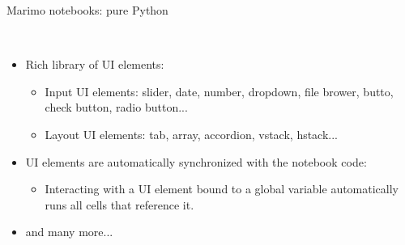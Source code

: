 \documentclass[11pt, serif, mathserif, compress]{beamer}  %
\begin{document}
\begin{frame}{Marimo notebooks: pure Python}

  \begin {bclogo}[noborder=true, couleur=gray!20, couleurBarre=Chocolate, logo=\raisebox{1mm}{\,\huge😍}, marge=0, margeG=-0.5, margeD=-0.5]
    {\ }\smallskip

    \begin{itemize}\setlength\itemsep{3mm}
      
    \item Rich library of UI elements:
      
      \begin{itemize}\setlength\itemsep{1mm}        
      \item<2-> Input UI elements: slider, date, number, dropdown, file brower, butto, check button, radio button...
      \item<3-> Layout UI elements: tab, array, accordion, vstack, hstack...
      \end{itemize}

    \item<4-> UI elements are automatically synchronized with the notebook code:
    
      \begin{itemize}\setlength\itemsep{1mm}        
      \item Interacting with a UI element bound to a global variable automatically runs all cells that reference it.
      \end{itemize}
  
    \item<5-> and many more... 

    \end{itemize}
  \end{bclogo}

\end{frame}
\end{document}
